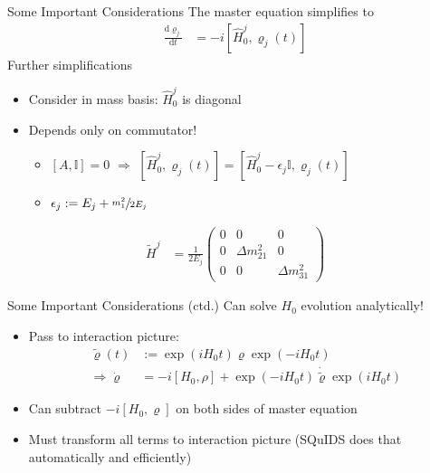 \documentclass[]{beamer}
\begin{document}
\begin{frame}{Some Important Considerations}
  The master equation simplifies to
  \begin{align*}
    \frac{\mathrm{d}\varrho_j}{\mathrm{d}t} &= -i [\hat{H}_0^j, \varrho_j(t)]
  \end{align*}
  Further simplifications
  \begin{itemize}
    \item Consider in mass basis: \(\hat{H}_0^j\) is diagonal
    \item Depends only on commutator!
    \begin{itemize}
      \item \([A, \mathbb{I}] = 0\) \(\Rightarrow\) \([\hat{H}_0^j, \varrho_j(t)] = [\hat{H}_0^j - \epsilon_j \mathbb{I}, \varrho_j(t)]\)
      \item \(\epsilon_j := E_j + \sfrac{m_1^2}{2 E_j}\)
    \end{itemize}
  \end{itemize}
  \begin{align*}
    \tilde{H}^j &= \frac{1}{2E_j}\begin{pmatrix}
      0 & 0 & 0 \\
      0 & \Delta m_{21}^2 & 0 \\
      0 & 0 & \Delta m_{31}^2 
    \end{pmatrix}
  \end{align*}
\end{frame}

\begin{frame}{Some Important Considerations (ctd.)}
  Can solve \(H_0\) evolution analytically!
  \begin{itemize}
    \item Pass to interaction picture:
    \begin{align*}
      \tilde{\varrho}(t) &:= \exp(i H_0 t) \varrho \exp(-i H_0 t) \\
      \Rightarrow \dot{\varrho} &= - i [H_0, \rho] + \exp(-i H_0 t) \dot{\tilde{\varrho}} \exp(i H_0 t)
    \end{align*}
    \item Can subtract \(-i[H_0, \varrho]\) on both sides of master equation
    \item Must transform all terms to interaction picture (SQuIDS does that automatically and efficiently)
  \end{itemize}
\end{frame}
\end{document}
